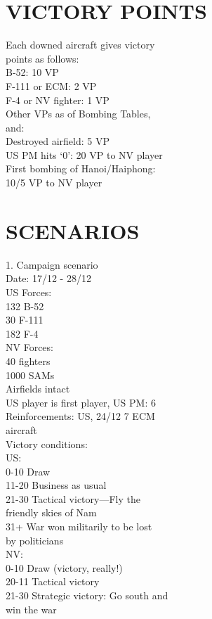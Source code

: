 \section*{VICTORY POINTS}
Each downed aircraft gives victory\\
points as follows:\\
B-52: 10 VP\\
F-111 or ECM: 2 VP\\
F-4 or NV fighter: 1 VP\\
Other VPs as of Bombing Tables,\\
and:\\
Destroyed airfield: 5 VP\\
US PM hits ‘0’: 20 VP to NV player\\
First bombing of Hanoi/Haiphong:\\
10/5 VP to NV player\\

\section*{SCENARIOS}
1. Campaign scenario\\
Date: 17/12 - 28/12\\
US Forces:\\
132 B-52\\
30 F-111\\
182 F-4\\
NV Forces:\\
40 fighters\\
1000 SAMs\\
Airfields intact\\
US player is first player, US PM: 6\\
Reinforcements: US, 24/12 7 ECM\\
aircraft\\
Victory conditions:\\
US:\\
0-10 Draw\\
11-20 Business as usual\\
21-30 Tactical victory—Fly the\\
friendly skies of Nam\\
31+ War won militarily to be lost\\
by politicians\\
NV:\\
0-10 Draw (victory, really!)\\
20-11 Tactical victory\\
21-30 Strategic victory: Go south and\\
win the war\\

